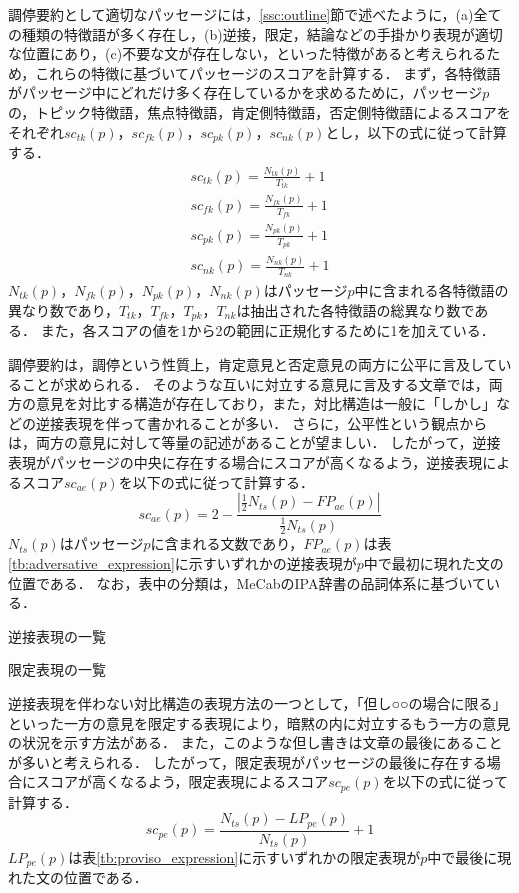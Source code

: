 \documentclass[japanese]{jnlp_1.4}
\begin{document}
調停要約として適切なパッセージには，\ref{ssc:outline}節で述べたように，(a)全ての種類の特徴語が多く存在し，(b)逆接，限定，結論などの手掛かり表現が適切な位置にあり，(c)不要な文が存在しない，といった特徴があると考えられるため，これらの特徴に基づいてパッセージのスコアを計算する．
まず，各特徴語がパッセージ中にどれだけ多く存在しているかを求めるために，パッセージ$p$の，トピック特徴語，焦点特徴語，肯定側特徴語，否定側特徴語によるスコアをそれぞれ$sc_{tk}(p)$，$sc_{fk}(p)$，$sc_{pk}(p)$，$sc_{nk}(p)$とし，以下の式に従って計算する．
{\allowdisplaybreaks
\begin{gather}
sc_{tk}(p)=\frac{N_{tk}(p)}{T_{tk}}+1 \\
sc_{fk}(p)=\frac{N_{fk}(p)}{T_{fk}}+1 \\
sc_{pk}(p)=\frac{N_{pk}(p)}{T_{pk}}+1 \\
sc_{nk}(p)=\frac{N_{nk}(p)}{T_{nk}}+1 
\end{gather}
}
$N_{tk}(p)$，$N_{fk}(p)$，$N_{pk}(p)$，$N_{nk}(p)$はパッセージ$p$中に含まれる各特徴語の異なり数であり，$T_{tk}$，$T_{fk}$，$T_{pk}$，$T_{nk}$は抽出された各特徴語の総異なり数である．
また，各スコアの値を1から2の範囲に正規化するために1を加えている．

調停要約は，調停という性質上，肯定意見と否定意見の両方に公平に言及していることが求められる．
そのような互いに対立する意見に言及する文章では，両方の意見を対比する構造が存在しており，また，対比構造は一般に「しかし」などの逆接表現を伴って書かれることが多い．
さらに，公平性という観点からは，両方の意見に対して等量の記述があることが望ましい．
したがって，逆接表現がパッセージの中央に存在する場合にスコアが高くなるよう，逆接表現によるスコア$sc_{ae}(p)$を以下の式に従って計算する．
\begin{equation}
sc_{ae}(p)=2 - \frac{|\frac{1}{2}N_{ts}(p)-FP_{ae}(p)|}{\frac{1}{2}N_{ts}(p)} 
\end{equation}
$N_{ts}(p)$はパッセージ$p$に含まれる文数であり，$FP_{ae}(p)$は表\ref{tb:adversative_expression}に示すいずれかの逆接表現が$p$中で最初に現れた文の位置である．
なお，表中の分類は，MeCabのIPA辞書の品詞体系に基づいている．

\begin{table}[t]
 \caption{逆接表現の一覧}
 \label{tb:adversative_expression}

\end{table}
\begin{table}[t]
 \caption{限定表現の一覧}
 \label{tb:proviso_expression}

\end{table}

逆接表現を伴わない対比構造の表現方法の一つとして，「但し○○の場合に限る」といった一方の意見を限定する表現により，暗黙の内に対立するもう一方の意見の状況を示す方法がある．
また，このような但し書きは文章の最後にあることが多いと考えられる．
したがって，限定表現がパッセージの最後に存在する場合にスコアが高くなるよう，限定表現によるスコア$sc_{pe}(p)$を以下の式に従って計算する．
\begin{equation}
sc_{pe}(p)=\frac{N_{ts}(p)-LP_{pe}(p)}{N_{ts}(p)}+1
\end{equation}
$LP_{pe}(p)$は表\ref{tb:proviso_expression}に示すいずれかの限定表現が$p$中で最後に現れた文の位置である．
\end{document}
